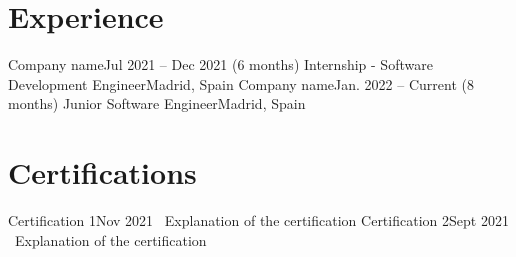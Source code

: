 	\section{Experience}
		\resumeSubHeadingListStart
			\resumeSubheading
				{Company name}{Jul 2021 -- Dec 2021 (6 months)}
				{Internship - Software Development Engineer}{Madrid, Spain}
			\resumeSubheading
				{Company name}{Jan. 2022 -- Current (8 months)}
				{Junior Software Engineer}{Madrid, Spain}
			\resumeItemListStart
			\resumeItemListEnd
		\resumeSubHeadingListEnd

	\section{Certifications}
		\resumeSubHeadingListStart
		\resumeSubheading
			{Certification 1}{Nov 2021}
			{~Explanation of the certification}{}
		\resumeSubheading
			{Certification 2}{Sept 2021}
			{~Explanation of the certification}{}
		\resumeSubHeadingListEnd
		

